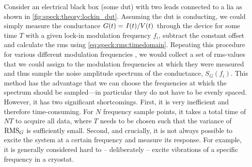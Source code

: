 Consider an electrical black box (some \gls{dut}) with two leads connected to a \gls{lia} as shown in \cref{fig:speck:theory:lockin_dut}.
Assuming the \gls{dut} is conducting, we could simply measure the conductance $G(t) = \flatfrac{I(t)}{V(t)}$ through the device for some time $T$ with a given lock-in modulation frequency $f_i$, subtract the constant offset
and calculate the \gls{rms} using \cref{eq:speck:rms:timedomain}.
Repeating this procedure for various different modulation frequencies , we would collect a set of \gls{rms}-values that we could assign to the modulation frequencies at which they were measured and thus sample the noise amplitude spectrum of the conductance, $S_G(f_i)$.
This method has the advantage that we can choose the frequencies at which the spectrum should be sampled---in particular they do not have to be evenly spaced.
However, it has two significant shortcomings.
First, it is very inefficient and therefore time-consuming.
For $N$ frequency sample points, it takes a total time of $NT$ to acquire all data, where $T$ needs to be chosen such that the variance of $\operatorname{RMS}_G$ is sufficiently small.
Second, and crucially, it is not always possible to excite the system at a certain frequency and measure its response.
For example, it is generally considered hard
to -- deliberately -- excite vibrations of a specific frequency in a cryostat.

